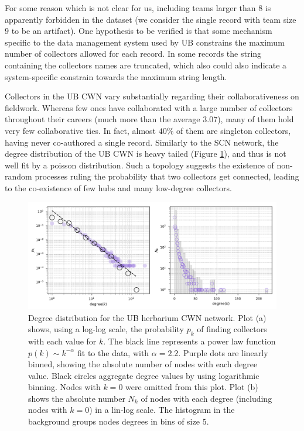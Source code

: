 For some reason which is not clear for us, including teams larger than $8$ is apparently forbidden in the dataset (we consider the single record with team size $9$ to be an artifact).
One hypothesis to be verified is that some mechanism specific to the data management system used by UB constrains the maximum number of collectors allowed for each record.
In some records the string containing the collectors names are truncated, which also could also indicate a system-specific constrain towards the maximum string length.

Collectors in the UB CWN vary substantially regarding their collaborativeness on fieldwork.
Whereas few ones have collaborated with a large number of collectors throughout their careers (much more than the average $3.07$), many of them hold very few collaborative ties.
In fact, almost $40\%$ of them are singleton collectors, having never co-authored a single record.
%
Similarly to the SCN network, the degree distribution of the UB CWN is heavy tailed (Figure \ref{fig:ub_cwn_degree_dist}), and thus is not well fit by a poisson distribution.
Such a topology suggests the existence of non-random processes ruling the probability that two collectors get connected, leading to the co-existence of few hubs and many low-degree collectors.
\begin{figure}[!ht]
  	\centering
    \includegraphics[width=\linewidth]{figures/casestudy_ub/cwn_degree_dist.pdf}
    \caption{ Degree distribution for the UB herbarium CWN network. Plot (a) shows, using a log-log scale, the probability $p_k$ of finding collectors with each value for $k$. The black line represents a power law function $p(k) \sim k^{-\alpha}$ fit to the data, with $\alpha=2.2$. Purple dots are linearly binned, showing the absolute number of nodes with each degree value. Black circles aggregate degree values by using logarithmic binning. Nodes with $k=0$ were omitted from this plot. Plot (b) shows the absolute number $N_k$ of nodes with each degree (including nodes with $k=0$) in a lin-log scale. The histogram in the background groups nodes degrees in bins of size $5$. }
    \label{fig:ub_cwn_degree_dist}
\end{figure}

